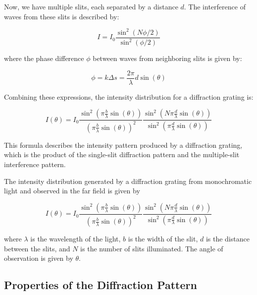 \documentclass[
  a4paper,
]{book}
\begin{document}
Now, we have multiple slits, each separated by a distance \(d\). The
interference of waves from these slits is described by:

\[
I = I_0 \frac{\sin^2(N \phi / 2)}{\sin^2(\phi / 2)}
\]

where the phase difference \(\phi\) between waves from neighboring slits
is given by:

\[
\phi = k \Delta s = \frac{2\pi}{\lambda} d \sin(\theta)
\]

Combining these expressions, the intensity distribution for a
diffraction grating is:

\[
I(\theta) = I_0 \frac{\sin^2\left(\pi \frac{b}{\lambda} \sin(\theta)\right)}{\left(\pi \frac{b}{\lambda} \sin(\theta)\right)^2} \frac{\sin^2\left(N \pi \frac{d}{\lambda} \sin(\theta)\right)}{\sin^2\left(\pi \frac{d}{\lambda} \sin(\theta)\right)}
\]

This formula describes the intensity pattern produced by a diffraction
grating, which is the product of the single-slit diffraction pattern and
the multiple-slit interference pattern.

\begin{tcolorbox}[enhanced jigsaw, breakable, toptitle=1mm, bottomrule=.15mm, colbacktitle=quarto-callout-note-color!10!white, title=\textcolor{quarto-callout-note-color}{\faInfo}\hspace{0.5em}{Diffraction Grating}, arc=.35mm, rightrule=.15mm, bottomtitle=1mm, opacityback=0, toprule=.15mm, coltitle=black, leftrule=.75mm, opacitybacktitle=0.6, colback=white, left=2mm, titlerule=0mm, colframe=quarto-callout-note-color-frame]

The intensity distribution generated by a diffraction grating from
monochromatic light and observed in the far field is given by

\[
I(\theta) = I_0 \frac{\sin^2\left(\pi \frac{b}{\lambda} \sin(\theta)\right)}{\left(\pi \frac{b}{\lambda} \sin(\theta)\right)^2} \frac{\sin^2\left(N \pi \frac{d}{\lambda} \sin(\theta)\right)}{\sin^2\left(\pi \frac{d}{\lambda} \sin(\theta)\right)}
\]

where \(\lambda\) is the wavelength of the light, \(b\) is the width of
the slit, \(d\) is the distance between the slits, and \(N\) is the
number of slits illuminated. The angle of observation is given by
\(\theta\).

\end{tcolorbox}

\subsection{Properties of the Diffraction
Pattern}\label{properties-of-the-diffraction-pattern}
\end{document}

